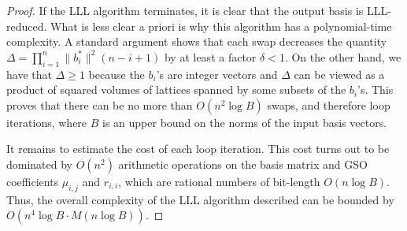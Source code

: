 \begin{proof}
    If the LLL algorithm terminates, it is clear that the output basis is LLL-reduced. What is less clear a priori is why this algorithm has a polynomial-time complexity. A standard argument shows that each swap decreases the quantity $\Delta = \prod_{i=1}^{n} \lVert b_i^* \rVert^2 (n - i + 1)$ by at least a factor $\delta < 1$. On the other hand, we have that $\Delta \geq 1$ because the $b_i$'s are integer vectors and $\Delta$ can be viewed as a product of squared volumes of lattices spanned by some subsets of the $b_i$'s. This proves that there can be no more than $O(n^2 \log B)$ swaps, and therefore loop iterations, where $B$ is an upper bound on the norms of the input basis vectors.

    It remains to estimate the cost of each loop iteration. This cost turns out to be dominated by $O(n^2)$ arithmetic operations on the basis matrix and GSO coefficients $\mu_{i,j}$ and $r_{i,i}$, which are rational numbers of bit-length $O(n \log B)$. Thus, the overall complexity of the LLL algorithm described can be bounded by $O(n^4 \log B \cdot M(n \log B))$.
    
\end{proof}